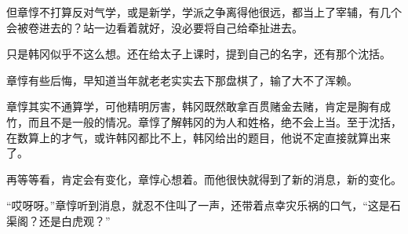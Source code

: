 但章惇不打算反对气学，或是新学，学派之争离得他很远，都当上了宰辅，有几个会被卷进去的？站一边看着就好，没必要将自己给牵扯进去。

只是韩冈似乎不这么想。还在给太子上课时，提到自己的名字，还有那个沈括。

章惇有些后悔，早知道当年就老老实实去下那盘棋了，输了大不了浑赖。

章惇其实不通算学，可他精明厉害，韩冈既然敢拿百贯赌金去赌，肯定是胸有成竹，而且不是一般的情况。章惇了解韩冈的为人和姓格，绝不会上当。至于沈括，在数算上的才气，或许韩冈都比不上，韩冈给出的题目，他说不定直接就算出来了。

再等等看，肯定会有变化，章惇心想着。而他很快就得到了新的消息，新的变化。

“哎呀呀。”章惇听到消息，就忍不住叫了一声，还带着点幸灾乐祸的口气，“这是石渠阁？还是白虎观？”

